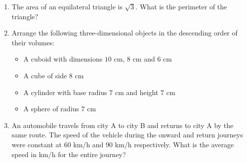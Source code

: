 \documentclass[journal,12pt,onecolumn]{IEEEtran}
\theoremstyle{remark}
\begin{document}
\begin{enumerate}
    \item The area of an equilateral triangle is $\sqrt{3}$. What is the perimeter of the triangle?
    
    \hfill{}
    \begin{enumerate}
    \end{enumerate}

    \item Arrange the following three-dimensional objects in the descending order of their volumes:
    \begin{itemize}
        \item {} A cuboid with dimensions $10$ cm, $8$ cm and $6$ cm
        \item {} A cube of side $8$ cm
        \item {} A cylinder with base radius $7$ cm and height $7$ cm
        \item {} A sphere of radius $7$ cm
    \end{itemize}
    
    \hfill{}
    \begin{enumerate}
    \end{enumerate}

    \item An automobile travels from city A to city B and returns to city A by the same route. The speed of the vehicle during the onward and return journeys were constant at $60$ km/h and $90$ km/h respectively. What is the average speed in km/h for the entire journey?
    
    \hfill{}
    \begin{enumerate}
    \end{enumerate}


\end{enumerate}
\end{document}

